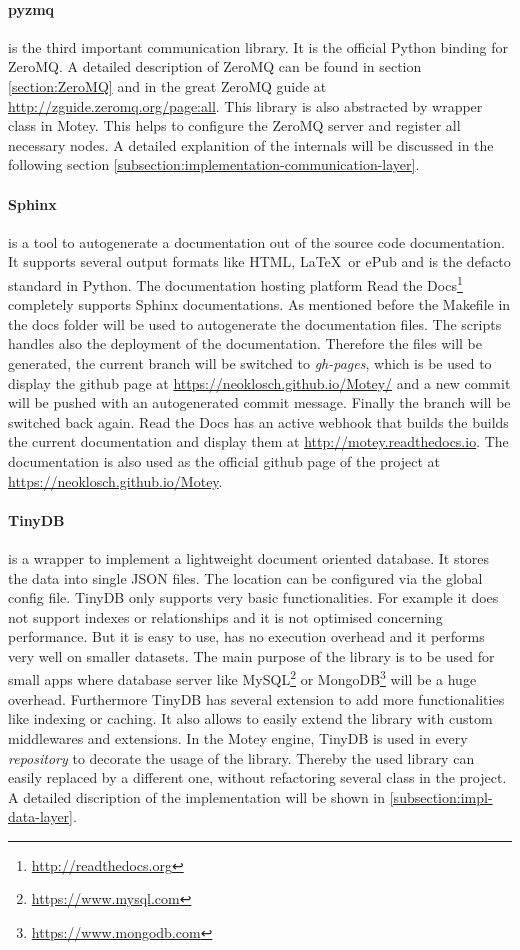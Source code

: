 \paragraph{pyzmq} is the third important communication library.
It is the official Python binding for ZeroMQ.
A detailed description of ZeroMQ can be found in section \ref{section:ZeroMQ} and in the great ZeroMQ guide at \url{http://zguide.zeromq.org/page:all}.
This library is also abstracted by wrapper class in Motey.
This helps to configure the ZeroMQ server and register all necessary nodes.
A detailed explanition of the internals will be discussed in the following section \ref{subsection:implementation-communication-layer}.

\paragraph{Sphinx} is a tool to autogenerate a documentation out of the source code documentation.
It supports several output formats like \ac{HTML}, \LaTeX\ or ePub and is the defacto standard in Python.
The documentation hosting platform Read the Docs\footnote{\url{http://readthedocs.org}} completely supports Sphinx documentations.
As mentioned before the Makefile in the docs folder will be used to autogenerate the documentation files.
The scripts handles also the deployment of the documentation.
Therefore the files will be generated, the current branch will be switched to \textit{gh-pages}, which is be used to display the github page at \url{https://neoklosch.github.io/Motey/} and a new commit will be pushed with an autogenerated commit message.
Finally the branch will be switched back again.
Read the Docs has an active webhook that builds the builds the current documentation and display them at \url{http://motey.readthedocs.io}.
The documentation is also used as the official github page of the project at \url{https://neoklosch.github.io/Motey}.

\paragraph{TinyDB} is a wrapper to implement a lightweight document oriented database.
It stores the data into single \ac{JSON} files.
The location can be configured via the global config file.
TinyDB only supports very basic functionalities.
For example it does not support indexes or relationships and it is not optimised concerning performance.
But it is easy to use, has no execution overhead and it performs very well on smaller datasets.
The main purpose of the library is to be used for small apps where database server like MySQL\footnote{\url{https://www.mysql.com}} or MongoDB\footnote{\url{https://www.mongodb.com}} will be a huge overhead.
Furthermore TinyDB has several extension to add more functionalities like indexing or caching.
It also allows to easily extend the library with custom middlewares and extensions.
In the Motey engine, TinyDB is used in every \textit{repository} to decorate the usage of the library.
Thereby the used library can easily replaced by a different one, without refactoring several class in the project.
A detailed discription of the implementation will be shown in \ref{subsection:impl-data-layer}.

